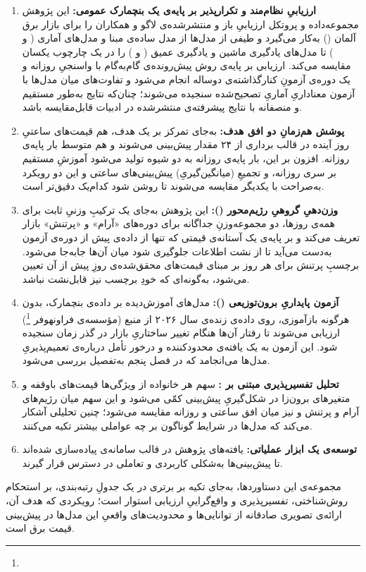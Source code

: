 \begin{enumerate}
\item \textbf{ارزیابیِ نظام‌مند و تکرارپذیر بر پایه‌ی یک بنچمارک عمومی:} این
پژوهش مجموعه‌داده و پروتکل ارزیابیِ باز و منتشرشده‌ی لاگو و همکاران
\cite{lago_forecasting_2021} را برای بازار برق آلمان () به‌کار
می‌گیرد و طیفی از مدل‌ها  از مدل ساده‌ی مبنا و مدل‌های آماری (
و ) تا مدل‌های یادگیری ماشین و یادگیری عمیق ( و
)  را در یک چارچوب یکسان مقایسه می‌کند. ارزیابی بر پایه‌ی روش
پیش‌رونده‌ی گام‌به‌گام با واسنجیِ روزانه و یک دوره‌ی آزمونِ کنارگذاشته‌ی دوساله
انجام می‌شود و تفاوت‌های میان مدل‌ها با آزمون معناداریِ آماریِ تصحیح‌شده سنجیده
می‌شوند؛ چنان‌که نتایج به‌طور مستقیم و منصفانه با نتایج پیشرفته‌ی منتشرشده در
ادبیات قابل‌مقایسه باشد.

\item \textbf{پوشش هم‌زمانِ دو افق هدف:} به‌جای تمرکز بر یک هدف، هم قیمت‌های
ساعتیِ روز آینده در قالب برداری از ۲۴ مقدار پیش‌بینی می‌شوند و هم متوسط بار
پایه‌ی روزانه. افزون بر این، بار پایه‌ی روزانه به دو شیوه تولید می‌شود 
آموزشِ مستقیم بر سری روزانه، و تجمیعِ (میانگین‌گیریِ) پیش‌بینی‌های ساعتی  و
این دو رویکرد به‌صراحت با یکدیگر مقایسه می‌شوند تا روشن شود کدام‌یک دقیق‌تر است.

\item \textbf{وزن‌دهیِ گروهیِ رژیم‌محور ():} این پژوهش
به‌جای یک ترکیبِ وزنیِ ثابت برای همه‌ی روزها، دو مجموعه‌وزنِ جداگانه برای
دوره‌های «آرام» و «پرتنش» بازار تعریف می‌کند و بر پایه‌ی یک آستانه‌ی قیمتی
 که تنها از داده‌ی پیش از دوره‌ی آزمون به‌دست می‌آید تا از نشت اطلاعات
جلوگیری شود  میان آن‌ها جابه‌جا می‌شود. برچسبِ پرتنش برای هر روز بر مبنای
قیمت‌های محقق‌شده‌ی روزِ پیش از آن تعیین می‌شود، به‌گونه‌ای که خودِ برچسب نیز
قابل‌نشت نباشد.

\item \textbf{آزمون پایداریِ برون‌توزیعی ():} مدل‌های
آموزش‌دیده بر داده‌ی بنچمارک، بدون هرگونه بازآموزی، روی داده‌ی زنده‌ی سال
۲۰۲۶ از منبع  (مؤسسه‌ی فراونهوفر \footnote{}) ارزیابی می‌شوند
تا رفتار آن‌ها هنگام تغییر ساختاریِ بازار در گذر زمان سنجیده شود. این آزمون به یک
یافته‌ی محدودکننده و درخور تأمل درباره‌ی تعمیم‌پذیریِ مدل‌ها می‌انجامد که در فصل
پنجم به‌تفصیل بررسی می‌شود.

\item \textbf{تحلیل تفسیرپذیری مبتنی بر :} سهم هر خانواده از ویژگی‌ها
 قیمت‌های باوقفه و متغیرهای برون‌زا  در شکل‌گیریِ پیش‌بینی کمّی می‌شود
و این سهم میان رژیم‌های آرام و پرتنش و نیز میان افق ساعتی و روزانه مقایسه می‌شود؛
چنین تحلیلی آشکار می‌کند که مدل‌ها در شرایط گوناگون بر چه عواملی بیشتر تکیه
می‌کنند.

\item \textbf{توسعه‌ی یک ابزار عملیاتی:} یافته‌های پژوهش در قالب سامانه‌ی
 پیاده‌سازی شده‌اند تا پیش‌بینی‌ها به‌شکلی کاربردی و
تعاملی در دسترس قرار گیرند.
\end{enumerate}

مجموعه‌ی این دستاوردها، به‌جای تکیه بر برتری در یک جدولِ رتبه‌بندی، بر استحکام
روش‌شناختی، تفسیرپذیری و واقع‌گراییِ ارزیابی استوار است؛ رویکردی که هدف آن،
ارائه‌ی تصویری صادقانه از توانایی‌ها و محدودیت‌های واقعیِ این مدل‌ها در پیش‌بینی
قیمت برق است.
